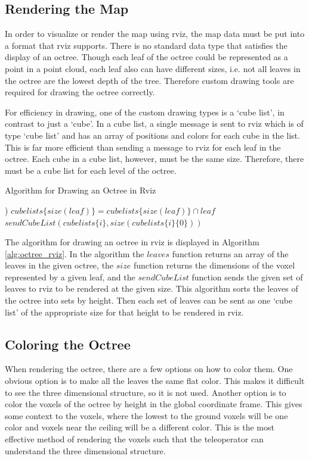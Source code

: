 \documentclass[12pt]{report}
\begin{document}
\subsection{Rendering the Map}
In order to visualize or render the map using rviz, the map data must be put into a format that rviz supports.  There is no standard data type that satisfies the display of an octree.  Though each leaf of the octree could be represented as a point in a point cloud, each leaf also can have different sizes, i.e. not all leaves in the octree are the lowest depth of the tree.  Therefore custom drawing tools are required for drawing the octree correctly.

For efficiency in drawing, one of the custom drawing types is a `cube list', in contrast to just a `cube'.  In a cube list, a single message is sent to rviz which is of type `cube list' and has an array of positions and colors for each cube in the list.  This is far more efficient than sending a message to rviz for each leaf in the octree.  Each cube in a cube list, however, must be the same size.  Therefore, there must be a cube list for each level of the octree.

\begin{algorithm}
\caption{Algorithm for Drawing an Octree in Rviz}
\label{alg:octree_rviz}
\begin{algorithmic}
  \STATE {}
  \STATE {})
    \STATE $cubelists\{size(leaf)\} = cubelists\{size(leaf)\} \cap leaf$
  \ENDFOR
    \STATE $sendCubeList(cubelists\{i\}, size(cubelists\{i\}\{0\}))$
  \ENDFOR
\end{algorithmic}
\end{algorithm}

The algorithm for drawing an octree in rviz is displayed in Algorithm \ref{alg:octree_rviz}.  In the algorithm the $leaves$ function returns an array of the leaves in the given octree, the $size$ function returns the dimensions of the voxel represented by a given leaf, and the $sendCubeList$ function sends the given set of leaves to rviz to be rendered at the given size.  This algorithm sorts the leaves of the octree into sets by height.  Then each set of leaves can be sent as one `cube list' of the appropriate size for that height to be rendered in rviz.

\subsection{Coloring the Octree}
When rendering the octree, there are a few options on how to color them.  One obvious option is to make all the leaves the same flat color.  This makes it difficult to see the three dimensional structure, so it is not used.  Another option is to color the voxels of the octree by height in the global coordinate frame.  This gives some context to the voxels, where the lowest to the ground voxels will be one color and voxels near the ceiling will be a different color.  This is the most effective method of rendering the voxels such that the teleoperator can understand the three dimensional structure.
\end{document}

